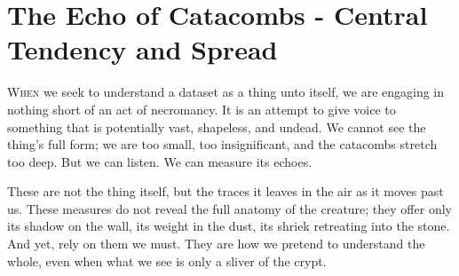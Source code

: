 \chapter{The Echo of Catacombs - Central Tendency and Spread}

\IMFellEnglish
\lettrine[lines=5, realheight]{W}{hen} we seek to understand a dataset as a thing unto itself, we are engaging in nothing short of an act of necromancy. It is an attempt to give voice to something that is potentially vast, shapeless, and undead. We cannot see the thing's full form; we are too small, too insignificant, and the catacombs stretch too deep. But we can listen. We can measure its echoes. 

These are not the thing itself, but the traces it leaves in the air as it moves past us. These measures do not reveal the full anatomy of the creature; they offer only its shadow on the wall, its weight in the dust, its shriek retreating into the stone. And yet, rely on them we must. They are how we pretend to understand the whole, even when what we see is only a sliver of the crypt.